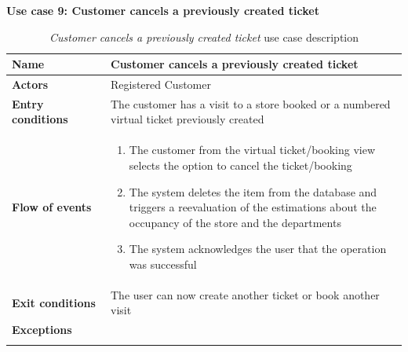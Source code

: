\clearpage
\textbf{Use case 9: Customer cancels a previously created ticket}
\smallskip
{}
\begin{longtable}{p{0.25\linewidth}p{0.75\linewidth}}
    \toprule
    \textbf{Name}             & \textbf{Customer cancels a previously created ticket}                                      \\
    \midrule
    \textbf{Actors}           & Registered Customer                                                                        \\
    \midrule
    \textbf{Entry conditions} & The customer has a visit to a store booked or a numbered virtual ticket previously created \\
    \midrule
    \textbf{Flow of events}   &
    \begin{enumerate}
        \item The customer from the virtual ticket/booking view selects the option to cancel the ticket/booking
        \item The system deletes the item from the database and triggers a reevaluation of the estimations about the occupancy of the store and the departments
        \item The system acknowledges the user that the operation was successful
    \end{enumerate}                                                                                             \\
    \midrule
    \textbf{Exit conditions}  & The user can now create another ticket or book another visit                               \\
    \midrule
    \textbf{Exceptions}       &                                                                                            \\
    \bottomrule
    \caption{\emph{Customer cancels a previously created ticket} use case description}
\end{longtable}





